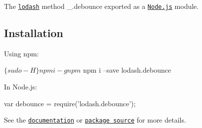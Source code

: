 The \href{https://lodash.com/}{\tt lodash} method {\ttfamily \+\_\+.\+debounce} exported as a \href{https://nodejs.org/}{\tt Node.\+js} module.

\subsection*{Installation}

Using npm\+: 
\begin{DoxyCode}
$ \{sudo -H\} npm i -g npm
$ npm i --save lodash.debounce
\end{DoxyCode}


In Node.\+js\+: 
\begin{DoxyCode}
var debounce = require('lodash.debounce');
\end{DoxyCode}


See the \href{https://lodash.com/docs#debounce}{\tt documentation} or \href{https://github.com/lodash/lodash/blob/4.0.8-npm-packages/lodash.debounce}{\tt package source} for more details. 